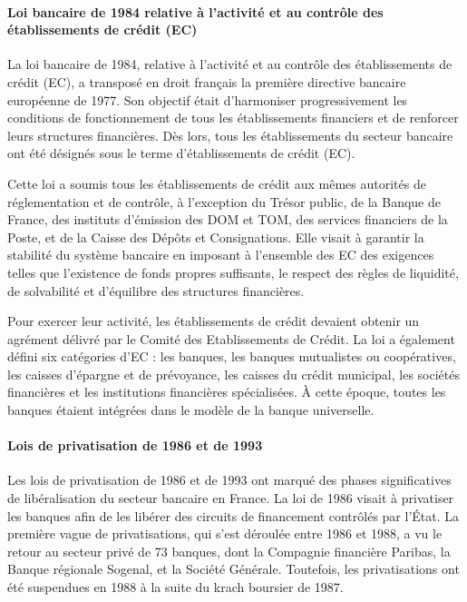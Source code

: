 \documentclass[a4paper, 12pt]{report}
\begin{document}
\paragraph{Loi bancaire de 1984 relative à l’activité et au contrôle des établissements de crédit (EC)}

La loi bancaire de 1984, relative à l’activité et au contrôle des établissements de crédit (EC), a transposé en droit français la première directive bancaire européenne de 1977. Son objectif était d’harmoniser progressivement les conditions de fonctionnement de tous les établissements financiers et de renforcer leurs structures financières. Dès lors, tous les établissements du secteur bancaire ont été désignés sous le terme d’établissements de crédit (EC).

Cette loi a soumis tous les établissements de crédit aux mêmes autorités de réglementation et de contrôle, à l'exception du Trésor public, de la Banque de France, des instituts d’émission des DOM et TOM, des services financiers de la Poste, et de la Caisse des Dépôts et Consignations. Elle visait à garantir la stabilité du système bancaire en imposant à l’ensemble des EC des exigences telles que l’existence de fonds propres suffisants, le respect des règles de liquidité, de solvabilité et d'équilibre des structures financières.

Pour exercer leur activité, les établissements de crédit devaient obtenir un agrément délivré par le Comité des Etablissements de Crédit. La loi a également défini six catégories d’EC : les banques, les banques mutualistes ou coopératives, les caisses d’épargne et de prévoyance, les caisses du crédit municipal, les sociétés financières et les institutions financières spécialisées. À cette époque, toutes les banques étaient intégrées dans le modèle de la banque universelle.

\paragraph{Lois de privatisation de 1986 et de 1993}

Les lois de privatisation de 1986 et de 1993 ont marqué des phases significatives de libéralisation du secteur bancaire en France. La loi de 1986 visait à privatiser les banques afin de les libérer des circuits de financement contrôlés par l’État. La première vague de privatisations, qui s'est déroulée entre 1986 et 1988, a vu le retour au secteur privé de 73 banques, dont la Compagnie financière Paribas, la Banque régionale Sogenal, et la Société Générale. Toutefois, les privatisations ont été suspendues en 1988 à la suite du krach boursier de 1987.
\end{document}
